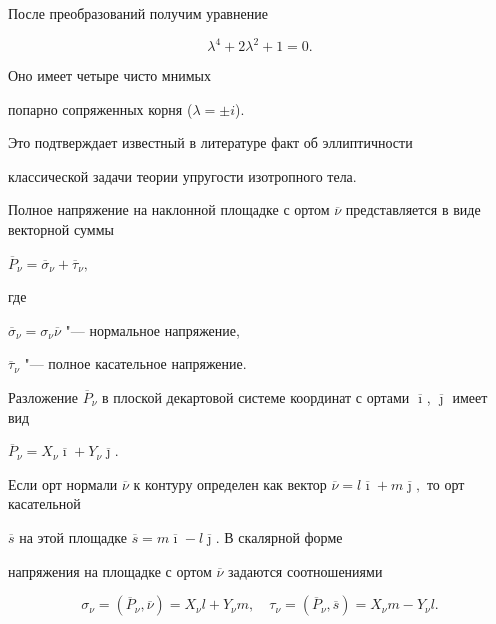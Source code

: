 После преобразований получим уравнение

$$\lambda^4+2\lambda^2+1=0.$$

Оно имеет четыре чисто мнимых

попарно сопряженных корня ($\lambda=\pm i $).

Это подтверждает известный в литературе факт об эллиптичности

 классической задачи теории упругости изотропного тела.



\smallskip


Полное напряжение на наклонной площадке с ортом $\overline{\nu}$ представляется в виде векторной суммы

$

\overline{P}_{\nu}=\overline{\sigma}_{\nu}+\overline{\tau}_{\nu},

$

где 

$\overline{\sigma}_{\nu}=\sigma_{\nu}\overline{\nu}$ "--- нормальное напряжение, 

$\overline{\tau}_{\nu}$ "--- полное касательное напряжение.

Разложение $\overline{P}_{\nu}$ в плоской декартовой системе координат с ортами $\overline{\imath}$, $\overline{\jmath}$ имеет вид

$\overline{P}_{\nu}=X_{\nu}\overline{\imath}+Y_{\nu}\overline{\jmath}.$



Если орт нормали $\overline{\nu}$ к контуру  определен как вектор $\overline{\nu}=l\overline{\imath}+m\overline{\jmath},$ то орт касательной

$\overline{s}$ на этой площадке  $\overline{s}=m\overline{\imath}-l\overline{\jmath}.$ В скалярной форме

напряжения на площадке с ортом $\overline{\nu}$ задаются соотношениями

\begin{equation}

\label{FeodorovaNA:or19}

\sigma_{\nu}=(\overline{P}_{\nu},\overline{\nu})=X_{\nu} l+Y_{\nu} m,

\quad

\tau_{\nu}=(\overline{P}_{\nu},\overline{s})=X_{\nu}m-Y_{\nu}l.

\end{equation}

